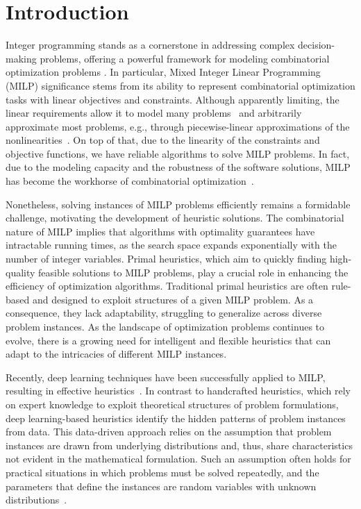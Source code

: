 \chapter*{Introduction}\label{chap:intro}

Integer programming stands as a cornerstone in addressing complex decision-making problems, offering a powerful framework for modeling combinatorial optimization problems \cite{wolseyFormulations2020}.
In particular, Mixed Integer Linear Programming (MILP) significance stems from its ability to represent combinatorial optimization tasks with linear objectives and constraints.
Although apparently limiting, the linear requirements allow it to model many problems~\cite{nemhauserScopeIntegerCombinatorial1988} and arbitrarily approximate most problems, e.g., through piecewise-linear approximations of the nonlinearities~\cite{camponogaraModelsAlgorithmsOptimal2015}.
On top of that, due to the linearity of the constraints and objective functions, we have reliable algorithms to solve MILP problems.
In fact, due to the modeling capacity and the robustness of the software solutions, MILP has become the workhorse of combinatorial optimization~\cite{bengioMachineLearningCombinatorial2021}.

Nonetheless, solving instances of MILP problems efficiently remains a formidable challenge, motivating the development of heuristic solutions.
The combinatorial nature of MILP implies that algorithms with optimality guarantees have intractable running times, as the search space expands exponentially with the number of integer variables.
Primal heuristics, which aim to quickly finding high-quality feasible solutions to MILP problems, play a crucial role in enhancing the efficiency of optimization algorithms.
Traditional primal heuristics are often rule-based and designed to exploit structures of a given MILP problem.
As a consequence, they lack adaptability, struggling to generalize across diverse problem instances.
As the landscape of optimization problems continues to evolve, there is a growing need for intelligent and flexible heuristics that can adapt to the intricacies of different MILP instances.


Recently, deep learning techniques have been successfully applied to MILP, resulting in effective heuristics~\cite{nairSolvingMixedInteger2021,gasseMachineLearningCombinatorial2022,larsenPredictingTacticalSolutions2022,khalilMIPGNNDataDrivenFramework2022,hanGNNGuidedPredictandSearchFramework2023}.
In contrast to handcrafted heuristics, which rely on expert knowledge to exploit theoretical structures of problem formulations, deep learning-based heuristics identify the hidden patterns of problem instances from data.
This data-driven approach relies on the assumption that problem instances are drawn from underlying distributions and, thus, share characteristics not evident in the mathematical formulation.
Such an assumption often holds for practical situations in which problems must be solved repeatedly, and the parameters that define the instances are random variables with unknown distributions~\cite{bengioMachineLearningCombinatorial2021}.

